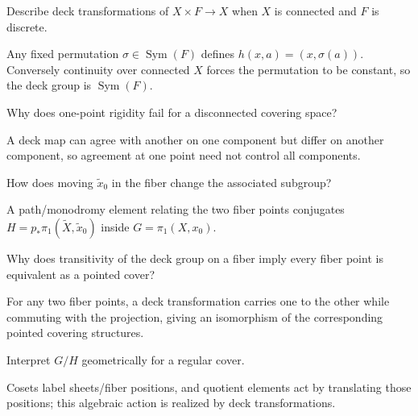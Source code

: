 \begin{problem}\label{prob:viii12-17}
Describe deck transformations of \(X\times F\to X\) when \(X\) is connected and \(F\) is discrete.
\end{problem}
\begin{solution}
Any fixed permutation \(\sigma\in\operatorname{Sym}(F)\) defines \(h(x,a)=(x,\sigma(a))\). Conversely continuity over connected \(X\) forces the permutation to be constant, so the deck group is \(\operatorname{Sym}(F)\).
\end{solution}

\begin{problem}\label{prob:viii12-18}
Why does one-point rigidity fail for a disconnected covering space?
\end{problem}
\begin{solution}
A deck map can agree with another on one component but differ on another component, so agreement at one point need not control all components.
\end{solution}

\begin{problem}\label{prob:viii12-19}
How does moving \(\tilde x_0\) in the fiber change the associated subgroup?
\end{problem}
\begin{solution}
A path/monodromy element relating the two fiber points conjugates \(H=p_*\pi_1(\widetilde X,\tilde x_0)\) inside \(G=\pi_1(X,x_0)\).
\end{solution}

\begin{problem}\label{prob:viii12-20}
Why does transitivity of the deck group on a fiber imply every fiber point is equivalent as a pointed cover?
\end{problem}
\begin{solution}
For any two fiber points, a deck transformation carries one to the other while commuting with the projection, giving an isomorphism of the corresponding pointed covering structures.
\end{solution}

\begin{problem}\label{prob:viii12-21}
Interpret \(G/H\) geometrically for a regular cover.
\end{problem}
\begin{solution}
Cosets label sheets/fiber positions, and quotient elements act by translating those positions; this algebraic action is realized by deck transformations.
\end{solution}

